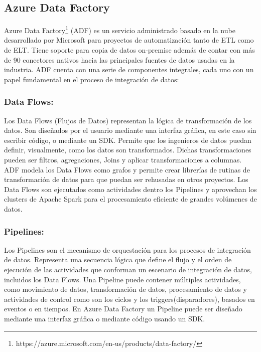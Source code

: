 \subsection{Azure Data Factory}

Azure Data Factory\footnote{https://azure.microsoft.com/en-us/products/data-factory/} (ADF) es un servicio 
administrado basado en la nube desarrollado por Microsoft para proyectos de 
automatización tanto de ETL como de ELT. Tiene soporte para copia de datos on-premise además de contar con  
m\'as de 90 conectores nativos hacia las principales fuentes de datos usadas en la industria\cite{azure_intro}. ADF cuenta con una 
serie de componentes integrales, cada uno con un papel fundamental en el proceso de integración de datos: 

\subsubsection{Data Flows:}

Los Data Flows (Flujos de Datos) representan la lógica de transformación de los datos. Son diseñados por el usuario 
mediante una interfaz gráfica, en este caso sin escribir código, o mediante un SDK. Permite que los ingenieros de 
datos puedan definir, visualmente, como los datos son transformados. Dichas transformaciones pueden ser filtros, 
agregaciones, Joins y aplicar transformaciones a columnas. ADF modela los Data Flows como grafos y permite crear 
librerías de rutinas de transformaci\'on de datos para que puedan ser rehusadas en otros proyectos. Los Data Flows 
son ejecutados como actividades dentro los Pipelines y aprovechan los clusters de Apache Spark para el procesamiento 
eficiente de grandes volúmenes de datos. 


\subsubsection{Pipelines:}

Los Pipelines son el mecanismo de orquestación para los procesos de integración de datos. Representa una secuencia 
lógica que define el flujo y el orden de ejecución de las actividades que conforman un escenario de integración de datos, 
incluidos los Data Flows. Una Pipeline puede contener múltiples actividades, como movimiento de datos, 
transformación de datos, procesamiento de datos y actividades de control como son los ciclos y los 
triggers(disparadores), basados en eventos o en tiempos. En Azure Data Factory un Pipeline puede ser diseñado 
mediante una interfaz gr\'afica o mediante c\'odigo usando un SDK.

